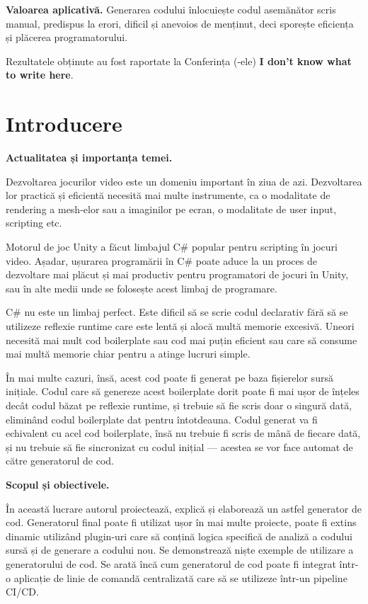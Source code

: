 \documentclass[a4paper,12pt]{report}
\newcommand{\unnumberedChapter}[1]{%
  \chapter*{#1}
  \addcontentsline{toc}{chapter}{#1}}
\newcommand{\conferencesList}{I don't know what to write here}
\begin{document}
\textbf{Valoarea aplicativă.} Generarea codului înlocuiește codul asemănător scris manual, predispus la erori, dificil și anevoios de menținut, deci sporește eficiența și plăcerea programatorului.


Rezultatele obținute au fost raportate la Conferința (-ele) \textbf{\conferencesList}.


\unnumberedChapter{Introducere}


\textbf{Actualitatea și importanța temei.}

Dezvoltarea jocurilor video este un domeniu important în ziua de azi.
Dezvoltarea lor practică și eficientă necesită mai multe instrumente, ca o modalitate de rendering a mesh-elor sau a imaginilor pe ecran, o modalitate de user input, scripting etc.

Motorul de joc Unity a făcut limbajul C\# popular pentru scripting în jocuri video.
Așadar, ușurarea programării în C\# poate aduce la un proces de dezvoltare mai plăcut și mai productiv pentru programatori de jocuri în Unity, sau în alte medii unde se folosește acest limbaj de programare.

C\# nu este un limbaj perfect.
Este dificil să se scrie codul declarativ fără să se utilizeze reflexie runtime care este lentă și alocă multă memorie excesivă.
Uneori necesită mai mult cod boilerplate sau cod mai puțin eficient sau care să consume mai multă memorie chiar pentru a atinge lucruri simple.

În mai multe cazuri, însă, acest cod poate fi generat pe baza fișierelor sursă inițiale.
Codul care să genereze acest boilerplate dorit poate fi mai ușor de înțeles decât codul băzat pe reflexie runtime, și trebuie să fie scris doar o singură dată, eliminând codul boilerplate dat pentru întotdeauna.
Codul generat va fi echivalent cu acel cod boilerplate, însă nu trebuie fi scris de mână de fiecare dată, și nu trebuie să fie sincronizat cu codul inițial — acestea se vor face automat de către generatorul de cod.


\textbf{Scopul și obiectivele.}

În această lucrare autorul proiectează, explică și elaborează un astfel generator de cod.
Generatorul final poate fi utilizat ușor în mai multe proiecte, poate fi extins dinamic utilizând plugin-uri care să conțină logica specifică de analiză a codului sursă și de generare a codului nou.
Se demonstrează niște exemple de utilizare a generatorului de cod.
Se arată încă cum generatorul de cod poate fi integrat într-o aplicație de linie de comandă centralizată care să se utilizeze într-un pipeline \ac{CI/CD}.
\end{document}
